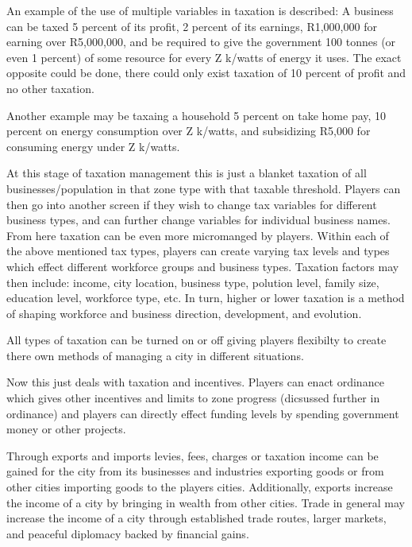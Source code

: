 An example of the use of multiple variables in taxation is described:
A business can be taxed 5 percent of its profit, 2 percent of its earnings, R1,000,000 for earning over R5,000,000, and be required to give the government 100 tonnes (or even 1 percent) of some resource for every Z k/watts of energy it uses. The exact opposite could be done, there could only exist taxation of 10 percent of profit and no other taxation. 

Another example may be taxaing a household 5 percent on take home pay, 10 percent on energy consumption over Z k/watts, and subsidizing R5,000 for consuming energy under Z k/watts.


At this stage of taxation management this is just a blanket taxation of all businesses/population in that zone type with that taxable threshold. Players can then go into another screen if they wish to change tax variables for different business types, and can further change variables for individual business names. From here taxation can be even more micromanged by players. Within each of the above mentioned tax types, players can create varying tax levels and types which effect different workforce groups and business types. Taxation factors may then include: income, city location, business type, polution level, family size, education level, workforce type, etc. In turn, higher or lower taxation is a method of shaping workforce and business direction, development, and evolution. 

All types of taxation can be turned on or off giving players flexibilty to create there own methods of managing a city in different situations.

Now this just deals with taxation and incentives. Players can enact ordinance which gives other incentives and limits to zone progress (dicsussed further in ordinance) and players can directly effect funding levels by spending government money or other projects. 



Through exports and imports levies, fees, charges or taxation income can be gained for the city from its businesses and industries exporting goods or from other cities importing goods to the players cities. Additionally, exports increase the income of a city by bringing in wealth from other cities. Trade in general may increase the income of a city through established trade routes, larger markets, and peaceful diplomacy backed by financial gains. 

